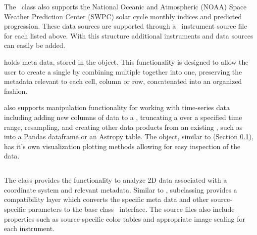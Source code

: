 The \Timeseries\ class also supports the National Oceanic and Atmospheric (NOAA) Space Weather Prediction Center (SWPC) solar cycle monthly indices and predicted progression.
These data sources are supported through a \Timeseries\ instrument source file for each listed above.
With this structure additional instruments and data sources can easily be added.

\Timeseries holds meta data, stored in the \Timeseriesmetadata object.
This functionality is designed to allow the user to create a single \Timeseries by combining multiple \Timeseries together into one, preserving the metadata relevant to each cell, column or row, concatenated into an organized fashion.

\Timeseries also supports manipulation functionality for working with time-series data including adding new columns of data to a \Timeseries, truncating a \Timeseries over a specified time range, resampling, and creating other data products from an existing \Timeseries, such as into a Pandas dataframe or an Astropy table.
The \Timeseries object, similar to \Map (Section \ref{sec:map}), has it's own visualization plotting methods allowing for easy inspection of the data.

\subsection{\Map}
\label{sec:map}

The \Map class provides the functionality to analyze 2D data associated with a coordinate system and relevant metadata.
Similar to \Timeseries, subclassing provides a compatibility layer which converts the specific meta data and other source-specific parameters to the base class \GenericMap\ interface.
The source files also include properties such as source-specific color tables and appropriate image scaling for each instrument.

